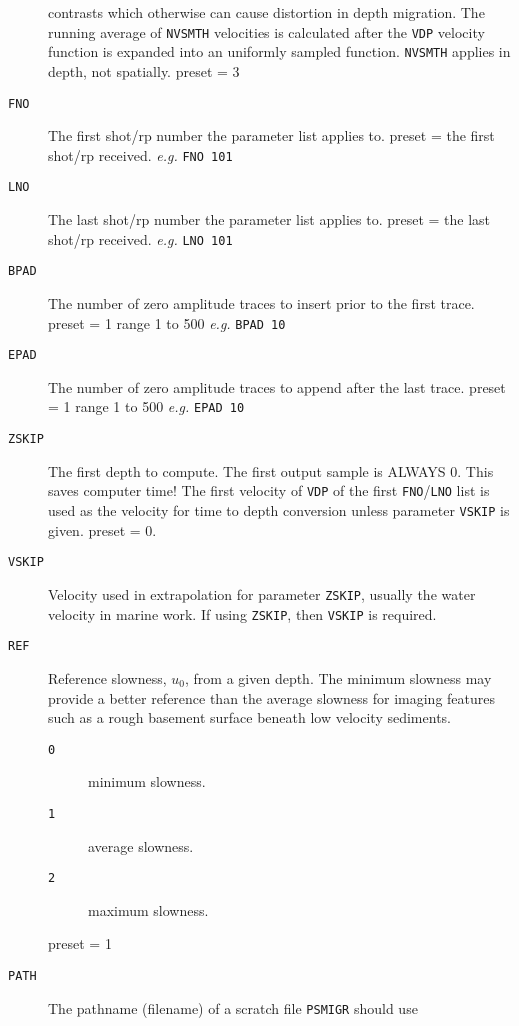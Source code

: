 \begin{description}
         contrasts which otherwise can cause distortion in depth
         migration.  The running average of \texttt{NVSMTH} velocities is
         calculated after the \texttt{VDP} velocity function is expanded
         into an uniformly sampled function.  \texttt{NVSMTH} applies in
         depth, not spatially.
         \Gls{preset} = 3
\item[\texttt{FNO}] The first \gls{shot}/\gls{rp} number the parameter list applies to.
         \Gls{preset} = the first \gls{shot}/\gls{rp} received.    \textit{e.g.}   \texttt{FNO 101}
\item[\texttt{LNO}] The last \gls{shot}/\gls{rp} number the parameter list applies to.
         \Gls{preset} = the last \gls{shot}/\gls{rp} received.    \textit{e.g.}   \texttt{LNO 101}
\item[\texttt{BPAD}] The number of zero amplitude traces to insert prior to the
         first trace.
         \Gls{preset} = 1   range 1 to 500      \textit{e.g.} \texttt{BPAD 10}
\item[\texttt{EPAD}] The number of zero amplitude traces to append after the last
         trace.
         \Gls{preset} = 1   range 1 to 500      \textit{e.g.} \texttt{EPAD 10}
\item[\texttt{ZSKIP}] The first depth to compute.  The first output sample is
         ALWAYS 0.  This saves computer time!  The first velocity of
         \texttt{VDP} of the first \texttt{FNO}/\texttt{LNO} list is used as the velocity for
         time to depth conversion unless parameter \texttt{VSKIP} is given.
         \Gls{preset} = 0.
\item[\texttt{VSKIP}] Velocity used in extrapolation for parameter \texttt{ZSKIP}, usually
         the water velocity in marine work. If using \texttt{ZSKIP}, then \texttt{VSKIP}
         is required.
     \item[\texttt{REF}] Reference slowness, $u_{0}$, from a given depth.  The minimum
         slowness may provide a better reference than the average
         slowness for imaging features such as a rough basement
         surface beneath low velocity sediments.
\begin{description}
\item[\texttt{0}] minimum slowness.
\item[\texttt{1}] average slowness.
\item[\texttt{2}] maximum slowness.
\end{description}
         \Gls{preset} = 1
\item[\texttt{PATH}] The pathname (filename) of a scratch file \texttt{PSMIGR} should use

\end{description}
